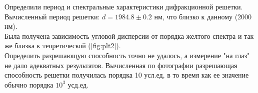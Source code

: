 \indent Определили период и спектральные характеристики дифракционной решетки. Вычисленный период решетки: $d = 1984.8 \pm 0.2$ нм, что близко к данному (2000 нм). \\
\indent Была получена зависимость угловой дисперсии от порядка желтого спектра и так же близка к теоретической (\ref{fig:plt2}). \\\indent Определить разрешающую способность точно не удалось, а измерение "на глаз" не дало адекватных результатов. Вычисленная по фотографии разрешающая способность решетки получилась порядка 10 усл.ед, в то время как ее значение обычно порядка $10^3$ усд.ед.\\\indent














